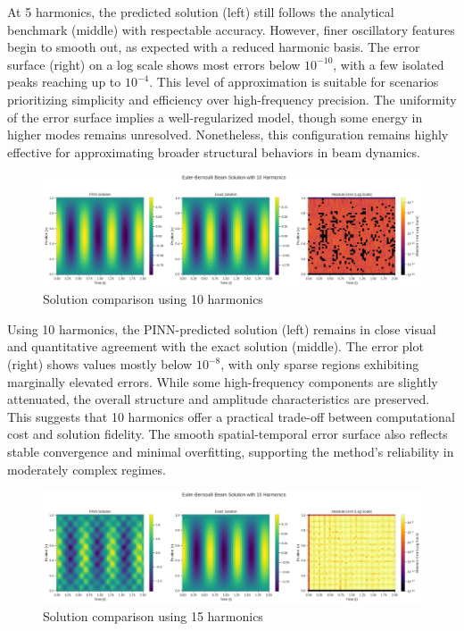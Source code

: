 \documentclass[preprint,12pt]{elsarticle}
\begin{document}
At 5 harmonics, the predicted solution (left) still follows the analytical benchmark (middle) with respectable accuracy. However, finer oscillatory features begin to smooth out, as expected with a reduced harmonic basis. The error surface (right) on a log scale shows most errors below \(10^{-10}\), with a few isolated peaks reaching up to \(10^{-4}\). This level of approximation is suitable for scenarios prioritizing simplicity and efficiency over high-frequency precision. The uniformity of the error surface implies a well-regularized model, though some energy in higher modes remains unresolved. Nonetheless, this configuration remains highly effective for approximating broader structural behaviors in beam dynamics.

\begin{figure}[t]
    \centering
    \includegraphics[width=0.9\linewidth]{figures/comparison_10h.png}
    \caption{Solution comparison using 10 harmonics}
    \label{fig:beam_10h}
\end{figure}

Using 10 harmonics, the PINN-predicted solution (left) remains in close visual and quantitative agreement with the exact solution (middle). The error plot (right) shows values mostly below \(10^{-8}\), with only sparse regions exhibiting marginally elevated errors. While some high-frequency components are slightly attenuated, the overall structure and amplitude characteristics are preserved. This suggests that 10 harmonics offer a practical trade-off between computational cost and solution fidelity. The smooth spatial-temporal error surface also reflects stable convergence and minimal overfitting, supporting the method’s reliability in moderately complex regimes.

\begin{figure}[t]
    \centering
    \includegraphics[width=0.9\linewidth]{figures/comparison_15h.png}
    \caption{Solution comparison using 15 harmonics}
    \label{fig:beam_15h}
\end{figure}
\end{document}

